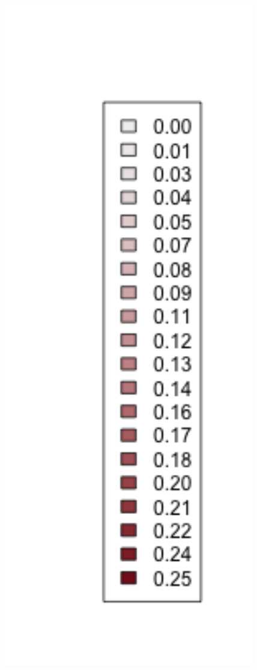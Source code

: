 \documentclass[ xcolor = pdftex, dvipsnames, table ]{beamer}
\begin{document}
\begin{frame}
\begin{minipage}[h!]{0.44\textwidth}
\end{minipage}
\begin{minipage}[h!]{0.09\textwidth}
\includegraphics[width=1.5\textwidth]{../../ptNew/subLegnd.png}
\end{minipage}
\end{frame}
\end{document}
